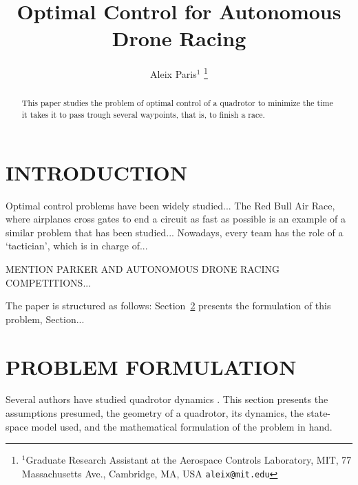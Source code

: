 \documentclass[letterpaper, 10 pt, conference]{ieeeconf}  %
\title{\LARGE \bf
Optimal Control for Autonomous Drone Racing
}
\author{Aleix Paris$^{1}$%
\thanks{$^{1}$Graduate Research Assistant at the Aerospace Controls Laboratory,
        MIT, 77 Massachusetts Ave., Cambridge, MA, USA
        {\tt\small aleix@mit.edu}}%
}
\begin{document}
\maketitle
\thispagestyle{empty}
\pagestyle{empty}


\begin{abstract}

This paper studies the problem of optimal control of a quadrotor to minimize the time it takes it to pass trough several waypoints, that is, to finish a race.

\end{abstract}


\section{INTRODUCTION}\label{s:intro}

Optimal control problems have been widely studied...
The Red Bull Air Race, where airplanes cross gates to end a circuit as fast as possible is an example of a similar problem that has been studied... Nowadays, every team has the role of a `tactician', which is in charge of...

MENTION PARKER AND AUTONOMOUS DRONE RACING COMPETITIONS...

The paper is structured as follows: Section~\ref{s:problem} presents the formulation of this problem, Section...


\section{PROBLEM FORMULATION}\label{s:problem}

Several authors have studied quadrotor dynamics \cite{IEEEexample:article_typical}. %
This section presents the assumptions presumed, the geometry of a quadrotor, its dynamics, the state-space model used, and the mathematical formulation of the problem in hand.
\end{document}
